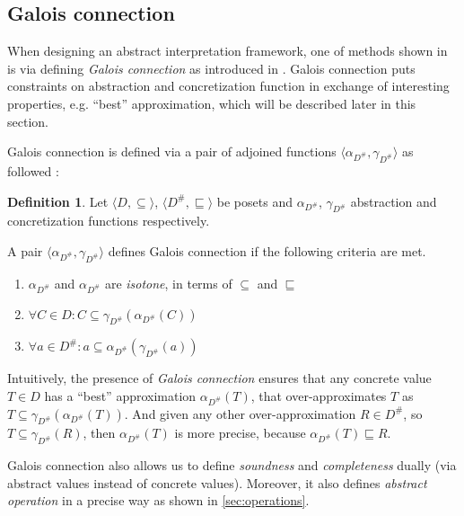 \documentclass[12pt,oneside]{fithesis2}
\theoremstyle{definition}
\newtheorem{definition}{Definition}
\begin{document}
\subsection{Galois connection}

When designing an abstract interpretation framework, one of methods shown in \cite{CousotCousot92-2} is via defining \textit{Galois connection} as introduced in \cite{CousotCousot76-1}. Galois connection puts constraints on abstraction and concretization function in exchange of interesting properties, e.g. ``best'' approximation, which will be described later in this section.

Galois connection is defined via a pair of adjoined functions $\langle \alpha_{D^\#}, \gamma_{D^\#} \rangle$ as followed \cite{CousotCousot79-1}:

\begin{definition}
  Let $\langle D, \subseteq \rangle$, $\langle D^\#, \sqsubseteq \rangle$ be posets and $\alpha_{D^\#}$, $\gamma_{D^\#}$ abstraction and concretization functions respectively.

  A pair $\langle \alpha_{D^\#}, \gamma_{D^\#} \rangle$ defines Galois connection if the following criteria are met.
  \begin{enumerate}
    \item $\alpha_{D^\#}$ and $\alpha_{D^\#}$ are \textit{isotone}, in terms of $\subseteq$ and $\sqsubseteq$
    \item $\forall C \in D: C \subseteq \gamma_{D^\#}(\alpha_{D^\#}(C))$
    \item $\forall a \in D^\#: a \subseteq \alpha_{D^\#}(\gamma_{D^\#}(a))$
  \end{enumerate}
\end{definition}

Intuitively, the presence of \textit{Galois connection} ensures that any concrete value $T \in D$ has a ``best'' approximation $\alpha_{D^\#}(T)$, that over-approximates $T$ as $T \subseteq \gamma_{D^\#}(\alpha_{D^\#}(T))$. And given any other over-approximation $R \in D^\#$, so $T \subseteq \gamma_{D^\#}(R)$, then $\alpha_{D^\#}(T)$ is more precise, because $\alpha_{D^\#}(T) \sqsubseteq R$.


Galois connection also allows us to define \textit{soundness} and \textit{completeness} dually (via abstract values instead of concrete values). Moreover, it also defines \textit{abstract operation} in a precise way as shown in \ref{sec:operations}.
\end{document}
